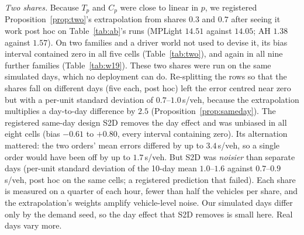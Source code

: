 \emph{Two shares.} Because $T_p$ and $C_p$ were close to linear in $p$, we registered Proposition~\ref{prop:two}'s extrapolation from
shares $0.3$ and $0.7$ after seeing it work post hoc on Table~\ref{tab:ab}'s runs (MPLight $14.51$ against $14.05$; AH $1.38$ against $1.57$).
On two families and a driver world not used to devise it, its bias interval contained zero in all five cells (Table~\ref{tab:two}),
and again in all nine further families (Table~\ref{tab:w19}). These two shares were run on the same simulated days, which no deployment
can do. Re-splitting the rows so that the shares fall on different days (five each, post hoc) left the error centred near zero but with
a per-unit standard deviation of $0.7$--$1.0$\,s/veh, because the extrapolation multiplies a day-to-day difference by $2.5$
(Proposition~\ref{prop:sameday}). The registered same-day design S2D removes the day effect and was unbiased in all eight cells (bias
$-0.61$ to $+0.80$, every interval containing zero). Its alternation mattered: the two orders' mean errors differed by up to
$3.4$\,s/veh, so a single order would have been off by up to $1.7$\,s/veh. But S2D was \emph{noisier} than separate days (per-unit
standard deviation of the 10-day mean $1.0$--$1.6$ against $0.7$--$0.9$\,s/veh, post hoc on the same cells; a registered prediction
that failed). Each share is measured on a quarter of each hour, fewer than half the vehicles per share, and the extrapolation's weights
amplify vehicle-level noise. Our simulated days differ only by the demand seed, so the day effect that S2D removes is small here. Real
days vary more.

\begin{table}[t]\centering\caption{Two-share extrapolation (0.3, 0.7) against the global effect (s/veh); registered cells}\label{tab:two}
\footnotesize{}\end{table}

